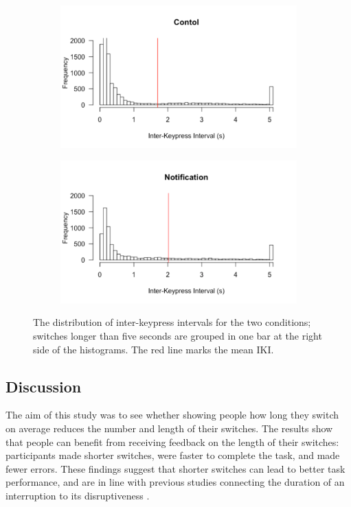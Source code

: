\begin{figure}
\centering
\begin{subfigure}{0.5\textwidth}
\centerline{\includegraphics[scale=0.5]{images/ch56/ch56-histIKIs_Control.pdf}}
\end{subfigure}
\begin{subfigure}{0.5\textwidth}
\centerline{\includegraphics[scale=0.5]{images/ch56/ch56-histIKIs_Not.pdf}}
\end{subfigure}
\caption{The distribution of inter-keypress intervals for the two conditions; switches longer than five seconds are grouped in one bar at the right side of the histograms. The red line marks the mean IKI.}
\label{fig:ch56-histikis}
\end{figure}

\subsection{Discussion}
The aim of this study was to see whether showing people how long they switch on average reduces the number and length of their switches. The results show that people can benefit from receiving feedback on the length of their switches: participants made shorter switches, were faster to complete the task, and made fewer errors. These findings suggest that shorter switches can lead to better task performance, and are in line with previous studies connecting the duration of an interruption to its disruptiveness \citep{Altmann2017, Monk2008}.


